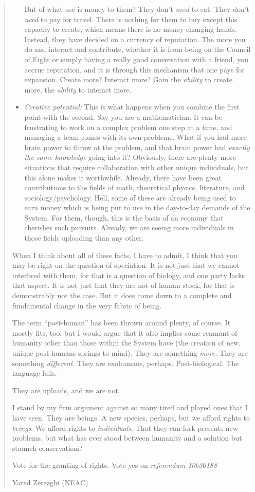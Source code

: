 \begin{quote}
\begin{itemize}
  But of what use is money to them? They don't \emph{need} to eat. They don't \emph{need} to pay for travel. There is nothing for them to buy except this capacity to create, which means there is no money changing hands. Instead, they have decided on a currency of reputation. The more you do and interact and contribute, whether it is from being on the Council of Eight or simply having a really good conversation with a friend, you accrue reputation, and it is through this mechanism that one pays for expansion. Create more? Interact more? Gain the \emph{ability} to create more, the \emph{ability} to interact more.
\item
  \emph{Creative potential:} This is what happens when you combine the first point with the second. Say you are a mathematician. It can be frustrating to work on a complex problem one step at a time, and managing a team comes with its own problems. What if you had more brain power to throw at the problem, and that brain power had \emph{exactly the same knowledge} going into it? Obviously, there are plenty more situations that require collaboration with other unique individuals, but this alone makes it worthwhile. Already, there have been great contributions to the fields of math, theoretical physics, literature, and sociology/psychology. Hell, some of these are already being used to earn money which is being put to use in the day-to-day demands of the System. For them, though, this is the basis of an economy that cherishes such pursuits. Already, we are seeing more individuals in those fields uploading than any other.
\end{itemize}

When I think about all of these facts, I have to admit, I think that you may be right on the question of speciation. It is not just that we cannot interbred with them, for that is a question of biology, and one party lacks that aspect. It is not just that they are not of human stock, for that is demonstrably not the case. But it does come down to a complete and fundamental change in the very fabric of being.

The term ``post-human'' has been thrown around plenty, of course. It mostly fits, too, but I would argue that it also implies some remnant of humanity other than those within the System have (the creation of new, unique post-humans springs to mind). They are something \emph{more}. They are something \emph{different}. They are exohumans, perhaps. Post-biological. The language fails.

They are uploads, and we are not.

I stand by my firm argument against so many tired and played ones that I have seen. They are beings. A new species, perhaps, but we afford rights to \emph{beings}. We afford rights to \emph{individuals}. That they can fork presents new problems, but what has ever stood between humanity and a solution but staunch conservatism?

Vote for the granting of rights. Vote yes on \emph{referendum 10b30188}

Yared Zerezghi (NEAC)
\end{quote}

